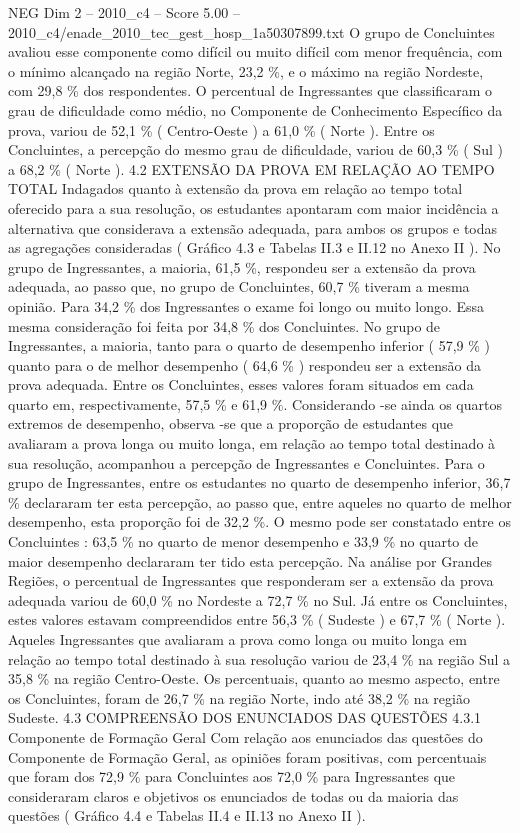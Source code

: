 \begin{textsample}{NEG Dim 2 – 2010\_c4 – Score 5.00 – 2010\_c4/enade\_2010\_tec\_gest\_hosp\_1a50307899.txt}
O grupo de Concluintes avaliou esse componente como difícil ou muito difícil com menor frequência, com o mínimo alcançado na região Norte, 23,2 \%, e o máximo na região Nordeste, com 29,8 \% dos respondentes.
O percentual de Ingressantes que classificaram o grau de dificuldade como médio, no Componente de Conhecimento Específico da prova, variou de 52,1 \% ( Centro-Oeste ) a 61,0 \% ( Norte ).
Entre os Concluintes, a percepção do mesmo grau de dificuldade, variou de 60,3 \% ( Sul ) a 68,2 \% ( Norte ). 4.2 EXTENSÃO DA PROVA EM RELAÇÃO AO TEMPO TOTAL Indagados quanto à extensão da prova em relação ao tempo total oferecido para a sua resolução, os estudantes apontaram com maior incidência a alternativa que considerava a extensão adequada, para ambos os grupos e todas as agregações consideradas ( Gráfico 4.3 e Tabelas II.3 e II.12 no Anexo II ).
No grupo de Ingressantes, a maioria, 61,5 \%, respondeu ser a extensão da prova adequada, ao passo que, no grupo de Concluintes, 60,7 \% tiveram a mesma opinião.
Para 34,2 \% dos Ingressantes o exame foi longo ou muito longo.
Essa mesma consideração foi feita por 34,8 \% dos Concluintes.
No grupo de Ingressantes, a maioria, tanto para o quarto de desempenho inferior ( 57,9 \% ) quanto para o de melhor desempenho ( 64,6 \% ) respondeu ser a extensão da prova adequada.
Entre os Concluintes, esses valores foram situados em cada quarto em, respectivamente, 57,5 \% e 61,9 \%.
Considerando -se ainda os quartos extremos de desempenho, observa -se que a proporção de estudantes que avaliaram a prova longa ou muito longa, em relação ao tempo total destinado à sua resolução, acompanhou a percepção de Ingressantes e Concluintes.
Para o grupo de Ingressantes, entre os estudantes no quarto de desempenho inferior, 36,7 \% declararam ter esta percepção, ao passo que, entre aqueles no quarto de melhor desempenho, esta proporção foi de 32,2 \%.
O mesmo pode ser constatado entre os Concluintes : 63,5 \% no quarto de menor desempenho e 33,9 \% no quarto de maior desempenho declararam ter tido esta percepção.
Na análise por Grandes Regiões, o percentual de Ingressantes que responderam ser a extensão da prova adequada variou de 60,0 \% no Nordeste a 72,7 \% no Sul.
Já entre os Concluintes, estes valores estavam compreendidos entre 56,3 \% ( Sudeste ) e 67,7 \% ( Norte ).
Aqueles Ingressantes que avaliaram a prova como longa ou muito longa em relação ao tempo total destinado à sua resolução variou de 23,4 \% na região Sul a 35,8 \% na região Centro-Oeste.
Os percentuais, quanto ao mesmo aspecto, entre os Concluintes, foram de 26,7 \% na região Norte, indo até 38,2 \% na região Sudeste. 4.3 COMPREENSÃO DOS ENUNCIADOS DAS QUESTÕES 4.3.1 Componente de Formação Geral Com relação aos enunciados das questões do Componente de Formação Geral, as opiniões foram positivas, com percentuais que foram dos 72,9 \% para Concluintes aos 72,0 \% para Ingressantes que consideraram claros e objetivos os enunciados de todas ou da maioria das questões ( Gráfico 4.4 e Tabelas II.4 e II.13 no Anexo II ).

\end{textsample}
